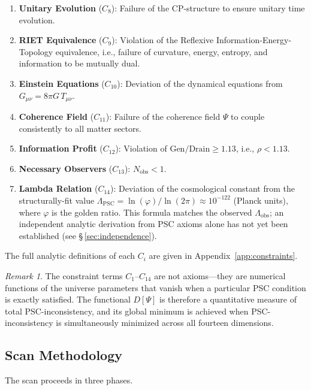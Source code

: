 \documentclass[11pt,twocolumn]{article}
\theoremstyle{remark}
\newtheorem{remark}[theorem]{Remark}
\begin{document}
\begin{enumerate}
  \item \textbf{Unitary Evolution} ($C_8$): Failure of the
        CP-structure to ensure unitary time evolution.
  \item \textbf{RIET Equivalence} ($C_9$): Violation of the
        Reflexive Information-Energy-Topology equivalence, i.e.,
        failure of curvature, energy, entropy, and information to
        be mutually dual.
  \item \textbf{Einstein Equations} ($C_{10}$): Deviation of the
        dynamical equations from $G_{\mu\nu}=8\pi G\,T_{\mu\nu}$.
  \item \textbf{Coherence Field} ($C_{11}$): Failure of the
        coherence field $\Psi$ to couple consistently to all
        matter sectors.
  \item \textbf{Information Profit} ($C_{12}$): Violation of
        $\mathrm{Gen}/\mathrm{Drain}\geq 1.13$,
        i.e., $\rho<1.13$.
  \item \textbf{Necessary Observers} ($C_{13}$):
        $N_{\mathrm{obs}}<1$.
  \item \textbf{Lambda Relation} ($C_{14}$): Deviation of the
        cosmological constant from the structurally-fit value
        $\Lambda_{\mathrm{PSC}}=\ln(\varphi)/\ln(2\pi)\approx 10^{-122}$
        (Planck units), where $\varphi$ is the golden ratio.
        This formula matches the observed $\Lambda_{\mathrm{obs}}$;
        an independent analytic derivation from PSC axioms alone has not
        yet been established (see \S\,\ref{sec:independence}).
\end{enumerate}
The full analytic definitions of each $C_i$ are given in
Appendix~\ref{app:constraints}.

\begin{remark}
The constraint terms $C_1$--$C_{14}$ are not axioms—they are
numerical functions of the universe parameters that vanish when
a particular PSC condition is exactly satisfied.
The functional $D[\Psi]$ is therefore a quantitative measure of
total PSC-inconsistency, and its global minimum is achieved when
PSC-inconsistency is simultaneously minimized across all fourteen
dimensions.
\end{remark}

\subsection{Scan Methodology}
\label{sec:method}

The scan proceeds in three phases.
\end{document}

